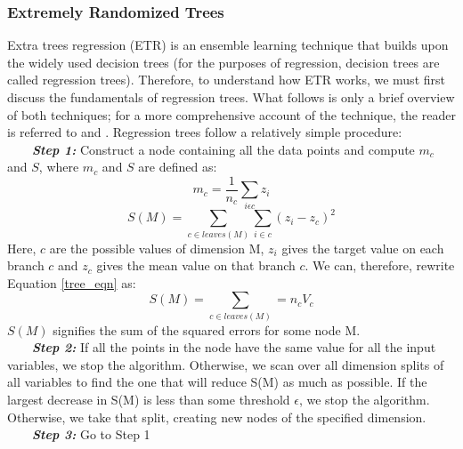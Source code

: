 \documentclass[a4paper,fleqn,usenatbib]{mnras}
\newcommand{\tabitem}{~~\llap{\textbullet}~~}
\begin{document}
\subsubsection{Extremely Randomized Trees} \label{etr}
Extra trees regression (ETR) is an ensemble learning technique that builds upon the widely used decision trees (for the purposes of regression, decision trees are called regression trees). Therefore, to understand how ETR works, we must first discuss the fundamentals of  regression trees. What follows is only a brief overview of both techniques; for a more comprehensive account of the technique, the reader is referred to \citet{breiman1984classification} and \citet{geurts2006extremely}. Regression trees follow a relatively simple procedure: \\[2ex]
\tabitem \textbf{\textit{Step 1:}} Construct a node containing all the data points and compute $m_c$ and $S$, where $m_c$ and $S$ are defined as:
\begin{equation}
m_c = \frac{1}{n_c} \sum_{i\epsilon c} z_i
\end{equation}
\begin{equation}
S(M) = \sum_{c \in leaves(M)} \sum_{i \in c} (z_i - z_c)^2
\label{tree_eqn}
\end{equation}
Here, $c$ are the possible values of dimension M, $z_i$ gives the target value on each branch $c$ and $z_c$ gives the mean value on that branch $c$. We can, therefore, rewrite Equation \ref{tree_eqn} as:
\begin{equation}
S(M) = \sum_{c\in leaves(M)} = n_c V_c
\end{equation}
$S(M)$ signifies the sum of the squared errors for some node M. \\
\tabitem \textbf{\textit{Step 2:}} If all the points in the node have the same value for all the input variables, we stop the algorithm. Otherwise, we  scan over all dimension splits of all variables to find the one
that will reduce S(M) as much as possible. If the largest decrease in S(M) is less than some threshold $\epsilon$, we stop the algorithm. Otherwise, we take that split, creating new nodes of the specified dimension. \\
\tabitem \textbf{\textit{Step 3:}} Go to Step 1 \\
\end{document}
